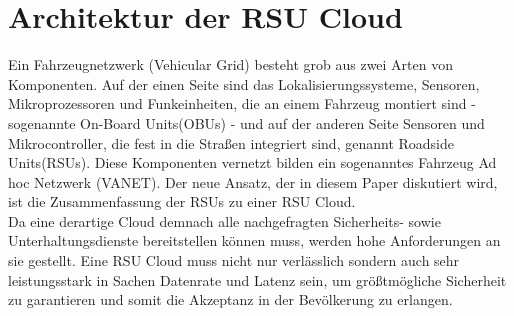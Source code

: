 \documentclass[conference]{IEEEtran}
\begin{document}
\section{Architektur der RSU Cloud}

Ein Fahrzeugnetzwerk (Vehicular Grid) besteht grob aus zwei Arten von Komponenten. Auf der einen Seite sind das Lokalisierungssysteme, Sensoren, Mikroprozessoren und Funkeinheiten, die an einem Fahrzeug montiert sind - sogenannte On-Board Units(OBUs) - und auf der anderen Seite  Sensoren und Mikrocontroller, die fest in die Straßen integriert sind, genannt Roadside Units(RSUs). Diese Komponenten vernetzt bilden ein sogenanntes Fahrzeug Ad hoc Netzwerk (VANET).  Der neue Ansatz, der in diesem Paper diskutiert wird, ist die Zusammenfassung der RSUs zu einer RSU Cloud.\\
Da eine derartige Cloud demnach alle nachgefragten Sicherheits- sowie Unterhaltungsdienste bereitstellen können muss, werden hohe Anforderungen an sie gestellt. Eine RSU Cloud muss nicht nur verlässlich sondern auch sehr leistungsstark in Sachen Datenrate und Latenz sein, um größtmögliche Sicherheit zu garantieren und somit die Akzeptanz in der Bevölkerung zu erlangen.\\
\end{document}
